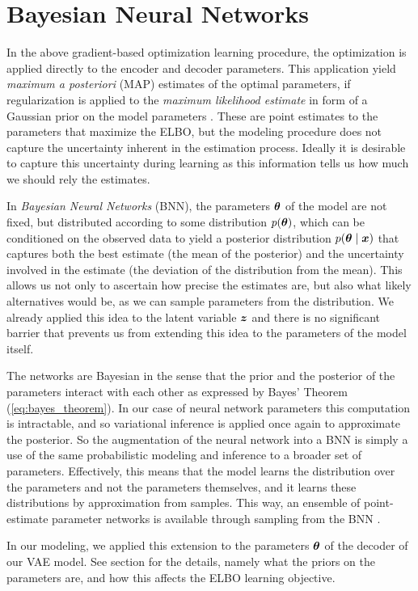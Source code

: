 \section{Bayesian Neural Networks}
In the above gradient-based optimization learning procedure, the optimization is applied directly to the encoder and decoder parameters. This application yield \textit{maximum a posteriori} (MAP) estimates of the optimal parameters, if regularization is applied to the \textit{maximum likelihood estimate} in form of a Gaussian prior on the model parameters \cite{blundell2015weight}. These are point estimates to the parameters that maximize the ELBO, but the modeling procedure does not capture the uncertainty inherent in the estimation process. Ideally it is desirable to capture this uncertainty during learning as this information tells us how much we should rely the estimates.

In \textit{Bayesian Neural Networks} (BNN), the parameters $\bm{ \theta }$ of the model are not fixed, but distributed according to some distribution $p(\bm{ \theta })$, which can be conditioned on the observed data to yield a posterior distribution $p(\bm{ \theta } \mid \bm{ x })$ that captures both the best estimate (the mean of the posterior) and the uncertainty involved in the estimate (the deviation of the distribution from the mean). This allows us not only to ascertain how precise the estimates are, but also what likely alternatives would be, as we can sample parameters from the distribution. We already applied this idea to the latent variable $\bm{ z }$ and there is no significant barrier that prevents us from extending this idea to the parameters of the model itself.

The networks are Bayesian in the sense that the prior and the posterior of the parameters interact with each other as expressed by Bayes' Theorem (\ref{eq:bayes_theorem}). In our case of neural network parameters this computation is intractable, and so variational inference is applied once again to approximate the posterior. So the augmentation of the neural network into a BNN is simply a use of the same probabilistic modeling and inference to a broader set of parameters. Effectively, this means that the model learns the distribution over the parameters and not the parameters themselves, and it learns these distributions by approximation from samples. This way, an ensemble of point-estimate parameter networks is available through sampling from the BNN \cite{blundell2015weight}.


In our modeling, we applied this extension to the parameters $\bm{ \theta }$ of the decoder of our VAE model. See section  for the details, namely what the priors on the parameters are, and how this affects the ELBO learning objective.

